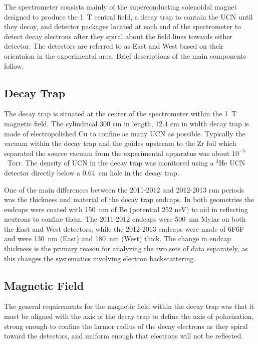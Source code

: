 The spectrometer consists mainly of the superconducting solenoidal magnet designed to produce
the 1~T central field, a decay trap to contain the UCN until they decay, and detector
packages located at each end of the spectrometer to detect decay electrons after they spiral
about the field lines towards either detector. The detectors are referred to as
East and West based on their orientaion in the experimental area.
Brief descriptions of the main components follow.

\subsection{Decay Trap}
The decay trap is situated at the center of the spectrometer within the 1~T magnetic
field. The cylindrical 300 cm in length, 12.4 cm in width decay trap is made of electropolished Cu
to confine as many UCN as possible. Typically the vacuum within the decay trap and the guides
upstream to the Zr foil which separated the source vacuum from the experimental apparatus was about
$10^{-5}$~Torr. The density of UCN in the decay trap was monitored using a $^3\mathrm{He}$ UCN detector
directly below a 0.64~cm hole in the decay trap.

One of the main differences between the 2011-2012 and 2012-2013 run periods was the thickness and
material of the decay trap endcaps. In both geometries the endcaps were coated with 150~nm of
Be (potential 252 neV) to aid in reflecting neutrons to confine them. The 2011-2012 endcaps
were 500~nm Mylar on both the East and West detectors, while the 2012-2013 endcaps were made of 6F6F
\cite{hoedl2003} and were 130~nm (East) and 180~nm (West) thick. The change in endcap thickness
is the primary reason for analyzing the two sets of data separately, as this changes the
systematics involving electron backscattering. 

\subsection{Magnetic Field} \label{ssec:MagneticField}

The general requirements for the magnetic field within the decay trap was that it must be aligned with
the axis of the decay trap to define the axis of polarization, strong enough to confine the larmor
radius of the decay electrons as they spiral toward the detectors, and uniform enough that
electrons will not be reflected.

